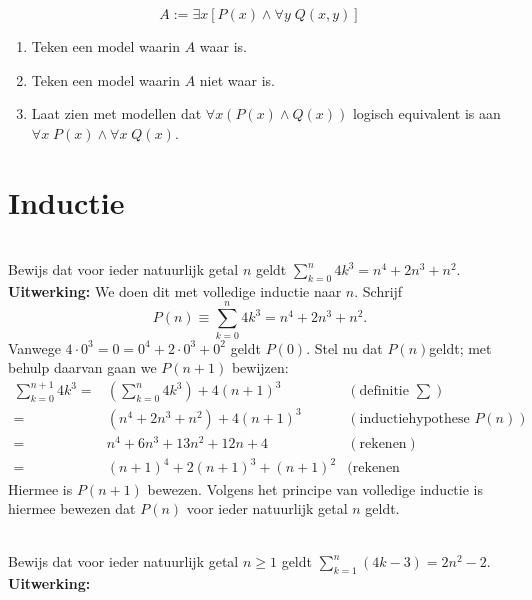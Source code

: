 \begin{answer}
$$A:=\exists x[P(x)\wedge\forall y\;Q(x,y)]$$
\begin{enumerate}[label=\textit{\alph*.}]
\item Teken een model waarin $A$ waar is.
\item Teken een model waarin $A$ niet waar is.
\item Laat zien met modellen dat $\forall x(P(x)\wedge Q(x))$ logisch equivalent is aan $\forall x\; P(x)\wedge\forall x\;Q(x)$.
\end{enumerate}
\end{answer}

\section{Inductie}
\setcounter{answerT}{0}
\begin{answer}\mbox{}\\
Bewijs dat voor ieder natuurlijk getal $n$ geldt $\sum\limits^{n}_{k=0} 4k^3=n^4+2n^3+n^2$.\\[2.5pt]

\noindent\textbf{Uitwerking:} We doen dit met volledige inductie naar $n$. Schrijf
$$P(n)\equiv\sum\limits^{n}_{k=0} 4k^3=n^4+2n^3+n^2.$$
Vanwege $4\cdot 0^3=0=0^4+2\cdot 0^3+0^2$ geldt $P(0)$. Stel nu dat $P(n)$geldt; met behulp daarvan gaan we $P(n+1)$ bewijzen:
$$\begin{array}{rll}
      \sum^{n+1}_{k=0}4k^3= & (\sum^n_{k=0}4k^3)+4(n+1)^3&(\text{definitie }\sum)\\
      = & (n^4+2n^3+n^2)+4(n+1)^3&(\text{inductiehypothese }P(n))\\
      = & n^4+6n^3+13n^2+12n+4 & (\text{rekenen})\\
      = & (n+1)^4+2(n+1)^3+(n+1)^2 & (\text{rekenen}
\end{array}$$
Hiermee is $P(n+1)$ bewezen. Volgens het principe van volledige inductie is hiermee bewezen dat $P(n)$ voor ieder natuurlijk getal $n$ geldt.
\end{answer}

\begin{answer}\mbox{}\\
Bewijs dat voor ieder natuurlijk getal $n\geq 1$ geldt $\sum\limits^{n}_{k=1}(4k-3)=2n^2-2$.\\[2.5pt]

\noindent\textbf{Uitwerking:}
\end{answer}

